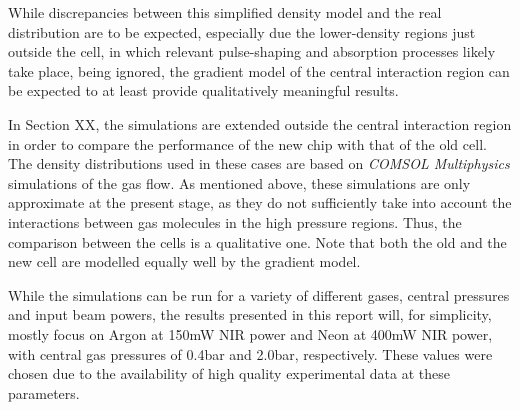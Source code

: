 \documentclass[a4paper]{jpconf}
\begin{document}
While discrepancies between this simplified density model and the real distribution are to be expected, especially due the lower-density regions just outside the cell, in which relevant pulse-shaping and absorption processes likely take place, being ignored, the gradient model of the central interaction region can be expected to at least provide qualitatively meaningful results. \par 
In Section XX, the simulations are extended outside the central interaction region in order to compare the performance of the new chip with that of the old cell. The density distributions used in these cases are based on \textit{COMSOL Multiphysics} simulations of the gas flow. As mentioned above, these simulations are only approximate at the present stage, as they do not sufficiently take into account the interactions between gas molecules in the high pressure regions. Thus, the comparison between the cells is a qualitative one. Note that both the old and the new cell are modelled equally well by the gradient model. \par 
While the simulations can be run for a variety of different gases, central pressures and input beam powers, the results presented in this report will, for simplicity, mostly focus on Argon at 150mW NIR power and Neon at 400mW NIR power, with central gas pressures of 0.4bar and 2.0bar, respectively. These values were chosen due to the availability of high quality experimental data at these parameters. 
\end{document}
